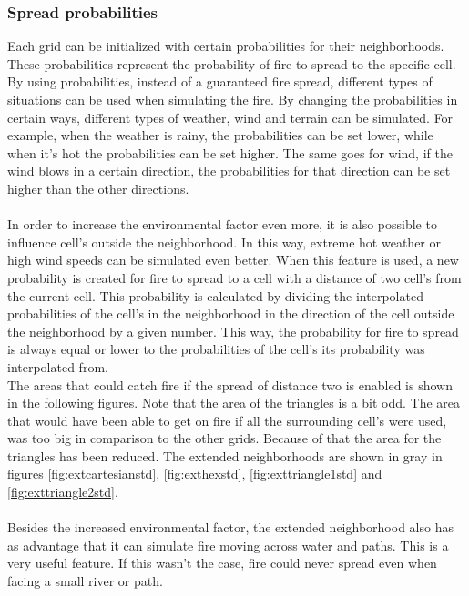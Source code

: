 \documentclass{article}
\newenvironment{Figure}
  {\par\medskip\noindent\minipage{\linewidth}}
  {\endminipage\par\medskip}
\begin{document}
\begin{multicols}{2}
\subsubsection*{Spread probabilities}
Each grid can be initialized with certain probabilities for their neighborhoods. These probabilities represent the probability of fire to spread to the specific cell. By using probabilities, instead of a guaranteed fire spread, different types of situations can be used when simulating the fire. By changing the probabilities in certain ways, different types of weather, wind and terrain can be simulated. For example, when the weather is rainy, the probabilities can be set lower, while when it’s hot the probabilities can be set higher. The same goes for wind, if the wind blows in a certain direction, the probabilities for that direction can be set higher than the other directions.\\\\
In order to increase the environmental factor even more, it is also possible to influence cell's outside the neighborhood. In this way, extreme hot weather or high wind speeds can be simulated even better. When this feature is used, a new probability is created for fire to spread to a cell with a distance of two cell's from the current cell. This probability is calculated by dividing the interpolated probabilities of the cell's in the neighborhood in the direction of the cell outside the neighborhood by a given number. This way, the probability for fire to spread is always equal or lower to the probabilities of the cell's its probability was interpolated from.\\
The areas that could catch fire if the spread of distance two is enabled is shown in the following figures. Note that the area of the triangles is a bit odd. The area that would have been able to get on fire if all the surrounding cell's were used, was too big in comparison to the other grids. Because of that the area for the triangles has been reduced. The extended neighborhoods are shown in gray in figures \ref{fig:extcartesianstd},  \ref{fig:exthexstd},  \ref{fig:exttriangle1std} and  \ref{fig:exttriangle2std}.\\\\
Besides the increased environmental factor, the extended neighborhood also has as advantage that it can simulate fire moving across water and paths. This is a very useful feature. If this wasn't the case, fire could never spread even when facing a small river or path.
\begin{Figure}

\end{Figure}
\end{multicols}
\end{document}
